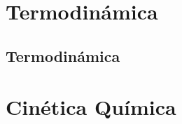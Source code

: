 \documentclass[
    11pt, %
    a4paper, %
]{LegrandOrangeBookES}
\begin{document}
    




    \part{Termodinámica}


    \chapterspaceabove{6.75cm} %
    \chapterspacebelow{7.25cm} %



    \chapter{Termodinámica}

    

    \newpage

    



    \part{Cinética Química}


    \chapterspaceabove{6.75cm} %
    \chapterspacebelow{7.25cm} %
\end{document}
